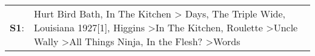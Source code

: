 \begin{supertabular}{p{0.03\textwidth}p{0.92\textwidth}}
 \textbf{S1}:  &  Hurt Bird Bath\textsuperscript{}, \enspace In The Kitchen\textsuperscript{} \textgreater {} Days\textsuperscript{}, \enspace The Triple Wide\textsuperscript{}, \enspace Louisiana 1927[1]\textsuperscript{}, \enspace Higgins\textsuperscript{} \textgreater \enspace In The Kitchen\textsuperscript{}, \enspace Roulette\textsuperscript{} \textgreater \enspace Uncle Wally\textsuperscript{} \textgreater \enspace All Things Ninja\textsuperscript{}, \enspace In the Flesh?\textsuperscript{} \textgreater \enspace Words\textsuperscript{}  \enspace  \\
\end{supertabular}
